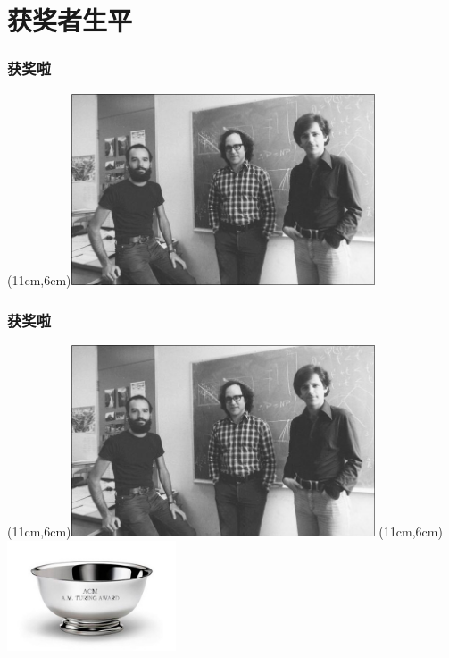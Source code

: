 \documentclass[slidestop,compress,mathserif]{beamer}
\begin{document}
\section{获奖者生平}

\begin{frame}
  \frametitle{获奖啦}
  \parpic(11cm,6cm){\includegraphics[width=9cm]{3peoples}}

\end{frame}

\begin{frame}
  \transboxout
  \frametitle{获奖啦}
  \parpic(11cm,6cm){\includegraphics[width=9cm]{3peoples}}
  \parpic(11cm,6cm){\includegraphics[width=5cm]{turing}}


\end{frame}
\end{document}
